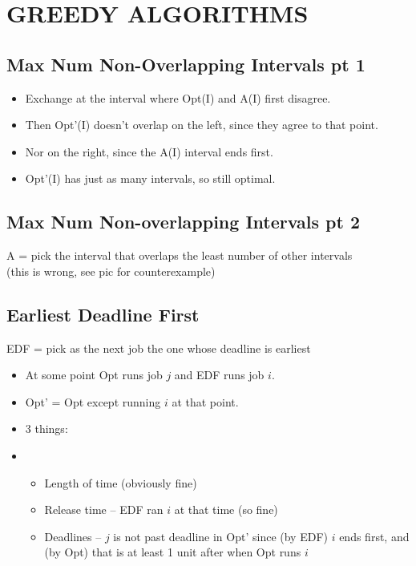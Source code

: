 \documentclass[12pt]{article}
\providecommand{\tightlist}{
    \setlength{\itemsep}{0pt}\setlength{\parskip}{0pt}
}
\begin{document}
\section{GREEDY ALGORITHMS}
\subsection{Max Num Non-Overlapping Intervals pt 1}
\begin{itemize}\tightlist
  \item Exchange at the interval where Opt(I) and A(I) first disagree.
  \item Then Opt'(I) doesn't overlap on the left, since they agree to that point.
  \item Nor on the right, since the A(I) interval ends first.
  \item Opt'(I) has just as many intervals, so still optimal.
\end{itemize}


\subsection{Max Num Non-overlapping Intervals pt 2}
A = pick the interval that overlaps the least number of other intervals\\
(this is wrong, see pic for counterexample)


\subsection{Earliest Deadline First}
EDF = pick as the next job the one whose deadline is earliest
\begin{itemize}\tightlist
  \item At some point Opt runs job $j$ and EDF runs job $i$.
  \item Opt' = Opt except running $i$ at that point.
  \item 3 things:
  \item \begin{itemize}\tightlist
    \item Length of time (obviously fine)
    \item Release time -- EDF ran $i$ at that time (so fine)
    \item Deadlines -- $j$ is not past deadline in Opt' since (by EDF) $i$ ends first, and (by Opt) that is at least 1 unit after when Opt runs $i$
  \end{itemize}
\end{itemize}
\end{document}
